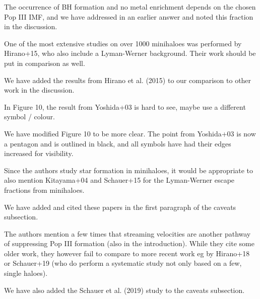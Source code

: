 \documentclass[11pt]{article}
\newenvironment{referee}[1][]{%
    \ignorespaces%
    \begin{mdframed}[style=myquotestyle,#1]%
}{%
    \end{mdframed}%
    \ignorespacesafterend%
}%
\begin{document}
The occurrence of BH formation and no metal enrichment depends on the chosen Pop III IMF, and we have addressed in an earlier answer and noted this fraction in the discussion.

\begin{referee}
One of the most extensive studies on over 1000 minihaloes was performed by Hirano+15, who also include a Lyman-Werner background. Their work should be put in comparison as well.
\end{referee}
We have added the results from Hirano et al. (2015) to our comparison to other work in the discussion.

\begin{referee}
In Figure 10, the result from Yoshida+03 is hard to see, maybe use a different symbol / colour.
\end{referee}
We have modified Figure 10 to be more clear. The point from Yoshida+03 is now a pentagon and is outlined in black, and all symbols have had their edges increased for visibility.

\begin{referee}
Since the authors study star formation in minihaloes, it would be appropriate to also mention Kitayama+04 and Schauer+15 for the Lyman-Werner escape fractions from minihaloes.
\end{referee}
We have added and cited these papers in the first paragraph of the caveats subsection.

\begin{referee}
The authors mention a few times that streaming velocities are another pathway of suppressing Pop III formation (also in the introduction). While they cite some older work, they however fail to compare to more recent work eg by Hirano+18 or Schauer+19 (who do perform a systematic study not only based on a few, single haloes).
\end{referee}
We have also added the Schauer et al. (2019) study to the caveats subsection.
\end{document}
